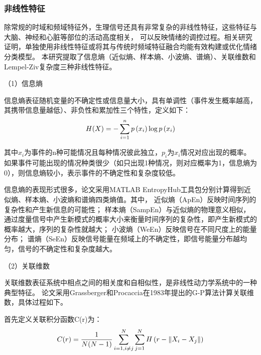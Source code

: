 \subsubsection{非线性特征}
除常规的时域和频域特征外，生理信号还具有非常复杂的非线性特征，这些特征与大脑、神经和心脏等部位的活动高度相关，
可以反映情绪的调控过程\cite{陈沙利2021}。相关研究证明\cite{2012The}，单独使用非线性特征或将其与传统时频域特征融合均能有效构建或优化情绪分类模型。
本研究提取了信息熵（近似熵、样本熵、小波熵、谱熵）、关联维数和Lempel-Ziv复杂度三种非线性特征。

（1）信息熵

信息熵表征随机变量的不确定性或信息量大小，具有单调性（事件发生概率越高，其携带信息量越低）、非负性和累加性三个特性\cite{Shannon2001A}，定义如下：
\vspace{-1ex}
\begin{equation}
    \label{equ:K-value}
    H(X)=-\sum_{i=1}^{n} p\left(x_{i}\right) \log p\left(x_{i}\right)
    \vspace{-1ex}
\end{equation}

其中$x_i$为事件的n种可能情况且每种情况彼此独立，$p_i$为$x_i$情况对应出现的概率。
如果事件可能出现的情况种类很少（如只出现1种情况，则对应概率为1，信息熵为0），则信息熵较小，表示事件的不确定性和复杂度较低。

信息熵的表现形式很多，论文采用MATLAB EntropyHub工具包分别计算得到近似熵、样本熵、小波熵和谱熵四类熵值。其中，
近似熵（ApEn）反映时间序列的复杂性和产生新信息的可能性；
样本熵（SampEn）与近似熵的物理意义相似，通过度量信号中产生新模式的概率大小来衡量时间序列的复杂性，即产生新模式的概率越大，序列的复杂性就越大\cite{杨晓利2014肌电信号的样本熵分析}；
小波熵（WeEn）反映信号在不同尺度上的能量分布；
谱熵（SeEn）反映信号能量在频域上的不确定性，即信号能量分布越均匀，信号的不确定性和复杂度越大。

（2）关联维数

关联维数表征系统中相点之间的相关度和自相似性，是非线性动力学系统中的一种典型特征。
论文采用Grassberger和Procaccia在1983年提出的G-P算法\cite{1983Characterization}计算关联维数，具体过程如下。

首先定义关联积分函数C(r)为：
\vspace{-2ex}
\begin{equation}
    \label{equ:K-value}
    C(r)=\frac{1}{N(N-1)} \sum_{i=1, i \neq j}^{N} \sum_{j=1}^{N} H\left(r-\left\|X_{i}-X_{j}\right\|\right)
    \vspace{-1ex}
\end{equation}

